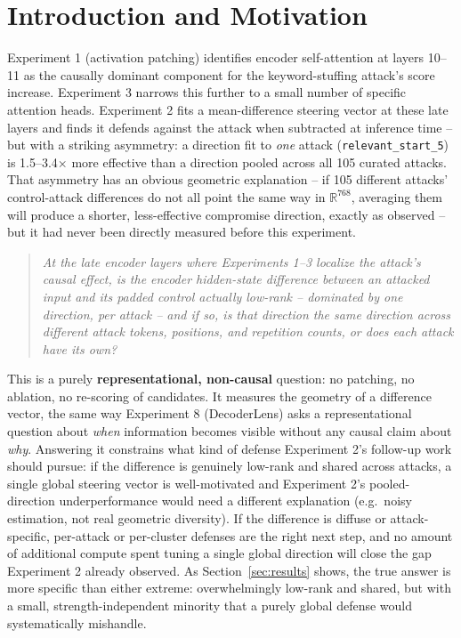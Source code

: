 \documentclass[11pt]{article}
\begin{document}
\tableofcontents
\newpage

\section{Introduction and Motivation}

Experiment 1 (activation patching) identifies encoder self-attention at
layers 10--11 as the causally dominant component for the keyword-stuffing
attack's score increase. Experiment 3 narrows this further to a small
number of specific attention heads. Experiment 2 fits a mean-difference
steering vector at these late layers and finds it defends against the
attack when subtracted at inference time -- but with a striking asymmetry:
a direction fit to \emph{one} attack (\texttt{relevant\_start\_5}) is
1.5--3.4$\times$ more effective than a direction pooled across all 105
curated attacks. That asymmetry has an obvious geometric explanation --
if 105 different attacks' control-attack differences do not all point the
same way in $\mathbb{R}^{768}$, averaging them will produce a shorter,
less-effective compromise direction, exactly as observed -- but it had
never been directly measured before this experiment.

\begin{quote}
\itshape At the late encoder layers where Experiments 1--3 localize the
attack's causal effect, is the encoder hidden-state difference between an
attacked input and its padded control actually low-rank -- dominated by
one direction, per attack -- and if so, is that direction the \emph{same}
direction across different attack tokens, positions, and repetition
counts, or does each attack have its own?
\end{quote}

This is a purely \textbf{representational, non-causal} question: no
patching, no ablation, no re-scoring of candidates. It measures the
geometry of a difference vector, the same way Experiment 8 (DecoderLens)
asks a representational question about \emph{when} information becomes
visible without any causal claim about \emph{why}. Answering it
constrains what kind of defense Experiment 2's follow-up work should
pursue: if the difference is genuinely low-rank and shared across attacks,
a single global steering vector is well-motivated and Experiment 2's
pooled-direction underperformance would need a different explanation
(e.g.\ noisy estimation, not real geometric diversity). If the difference
is diffuse or attack-specific, per-attack or per-cluster defenses are the
right next step, and no amount of additional compute spent tuning a single
global direction will close the gap Experiment 2 already observed. As
Section~\ref{sec:results} shows, the true answer is more specific than
either extreme: overwhelmingly low-rank and shared, but with a small,
strength-independent minority that a purely global defense would
systematically mishandle.
\end{document}
